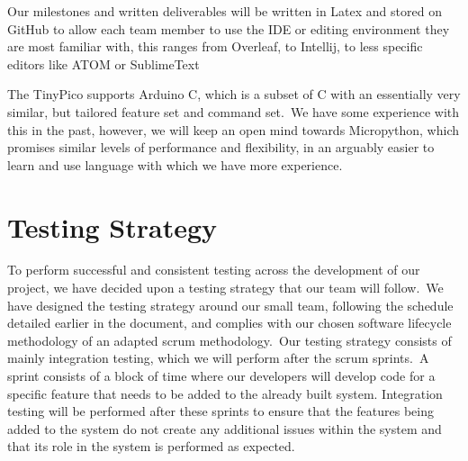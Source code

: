             Our milestones and written deliverables will be written in Latex and stored on GitHub to allow each
            team member to use the IDE or editing environment they are most familiar with, this ranges from Overleaf, to
            Intellij, to less specific editors like ATOM or SublimeText

            The TinyPico supports Arduino C, which is a subset of C with an essentially very similar, but tailored
            feature set and command set.\ We have some experience with this in the past, however, we will keep an open mind
            towards Micropython, which promises similar levels of performance and flexibility, in an arguably easier to
            learn and use language with which we have more experience.

    \section{Testing Strategy}
        To perform successful and consistent testing across the development of our project, we have decided upon a
        testing strategy that our team will follow.\ We have designed the testing strategy around our small team,
        following the schedule detailed earlier in the document, and complies with our chosen software lifecycle
        methodology of an adapted scrum methodology.\ Our testing strategy consists of mainly integration testing, which
        we will perform after the scrum sprints.\ A sprint consists of a block of time where our
        developers will develop code for a specific feature that needs to be added to the already built system.
        Integration testing will be performed after these sprints to ensure that the features being added
        to the system do not create any additional issues within the system and that its role in the system is performed
        as expected.

